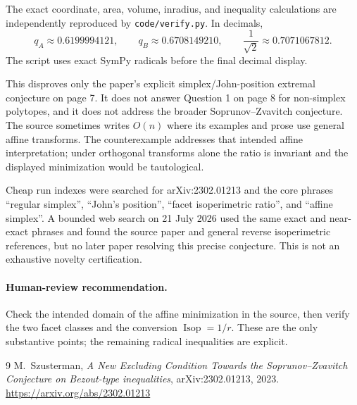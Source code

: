 \documentclass[11pt]{article}
\newcommand{\Isop}{\operatorname{Isop}}
\begin{document}
The exact coordinate, area, volume, inradius, and inequality calculations are
independently reproduced by \texttt{code/verify.py}.  In decimals,
\[
 q_A\approx0.6199994121,\qquad
 q_B\approx0.6708149210,\qquad
 \frac1{\sqrt2}\approx0.7071067812.
\]
The script uses exact SymPy radicals before the final decimal display.

This disproves only the paper's explicit simplex/John-position extremal
conjecture on page 7.  It does not answer Question 1 on page 8 for non-simplex
polytopes, and it does not address the broader Soprunov--Zvavitch conjecture.
The source sometimes writes $O(n)$ where its examples and prose use general
affine transforms.  The counterexample addresses that intended affine
interpretation; under orthogonal transforms alone the ratio is invariant and
the displayed minimization would be tautological.

Cheap run indexes were searched for arXiv:2302.01213 and the core phrases
``regular simplex'', ``John's position'', ``facet isoperimetric ratio'', and
``affine simplex''.  A bounded web search on 21 July 2026 used the same exact
and near-exact phrases and found the source paper and general reverse
isoperimetric references, but no later paper resolving this precise
conjecture.  This is not an exhaustive novelty certification.

\paragraph{Human-review recommendation.}
Check the intended domain of the affine minimization in the source, then
verify the two facet classes and the conversion $\Isop=1/r$.  These are the
only substantive points; the remaining radical inequalities are explicit.

\begin{thebibliography}{9}
M.~Szusterman,
\emph{A New Excluding Condition Towards the Soprunov--Zvavitch Conjecture on
Bezout-type inequalities}, arXiv:2302.01213, 2023.
\url{https://arxiv.org/abs/2302.01213}
\end{thebibliography}
\end{document}
